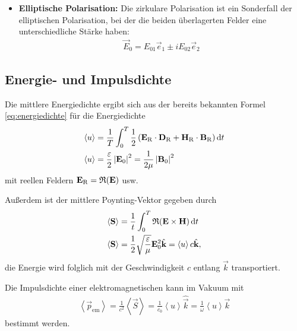\begin{itemize}
    \item \textbf{Elliptische Polarisation:} Die zirkulare Polarisation ist ein Sonderfall der elliptischen Polarisation, bei der die beiden überlagerten Felder eine unterschiedliche Stärke haben:
          \begin{align*}
              \vec E_0 = E_{01}\vec e_1 \pm i E_{02}\vec e_2
          \end{align*}
          
\end{itemize}




\subsection{Energie- und Impulsdichte}

Die mittlere Energiedichte ergibt sich aus der bereits bekannten Formel \eqref{eq:energiedichte} für die Energiedichte
\begin{align}
    \left\langle u\right\rangle & = \frac{1}{T} \int_0^T \frac{1}{2}\left(\mathbf{E}_\mathrm{R}\cdot \mathbf{D}_\mathrm{R}+\mathbf{H}_\mathrm{R}\cdot\mathbf{B}_\mathrm{R}\right)\mathop{}\!\mathrm{d} t \nonumber \\
    \label{eq:mittlere_energiedichte}
    \left\langle u\right\rangle & = \frac{\varepsilon}{2}\left|\mathbf{E}_0\right|^2 = \frac{1}{2\mu}\left|\mathbf{B}_0\right|^2
\end{align}
mit reellen Feldern $\mathbf{E}_\mathrm{R}=\operatorname{\mathfrak{R}}(\mathbf{E})$ usw.

Außerdem ist der mittlere Poynting-Vektor gegeben durch
\begin{align}
    \left\langle\mathbf{S}\right\rangle & = \frac{1}{t}\int_0^T\operatorname{\mathfrak{R}}(\mathbf{E}\times\mathbf{H})\mathop{}\!\mathrm{d} t \nonumber                                                  \\
    \label{eq:mittlerer_poyntingvektor}
    \left\langle\mathbf{S}\right\rangle & = \frac{1}{2} \sqrt{\frac{\varepsilon}{\mu}} \mathbf{E}_0^2 \hat{\mathbf{k}}= \left\langle u\right\rangle c \hat{\mathbf{k}},
\end{align}
die Energie wird folglich mit der Geschwindigkeit $c$ entlang $\vec k$ transportiert. 

Die Impulsdichte einer elektromagnetischen kann im Vakuum mit
\begin{align}
    \label{eq:mittlere_impulsdichte}
    \left\langle\vec p_\mathrm{em}\right\rangle = \frac{1}{c^2}\left\langle\vec S\right\rangle = \frac{1}{c_0} \left\langle u\right\rangle \hat{\vec k} = \frac{1}{\omega} \left\langle u\right\rangle \vec k
\end{align}
bestimmt werden. 


